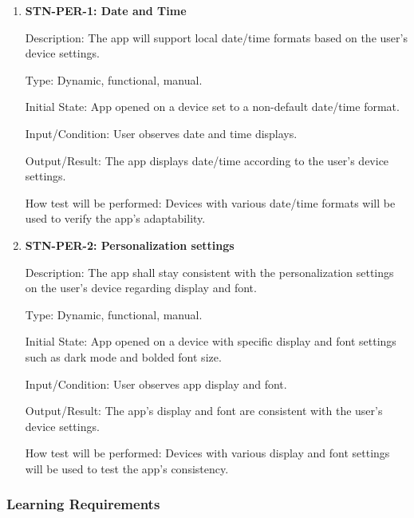 \documentclass[12pt, titlepage]{article}
\begin{document}
    \begin{enumerate}

        \item {\textbf{STN-PER-1: Date and Time}}

        Description: The app will support local date/time formats based on the user’s device settings.

        Type: Dynamic, functional, manual.

        Initial State: App opened on a device set to a non-default date/time format.

        Input/Condition: User observes date and time displays.

        Output/Result: The app displays date/time according to the user's device settings.

        How test will be performed: Devices with various date/time formats will be used to verify the app's adaptability.


        \item{\textbf{STN-PER-2: Personalization settings}}

        Description: The app shall stay consistent with the personalization settings on the user’s device regarding display and font.

        Type: Dynamic, functional, manual.

        Initial State: App opened on a device with specific display and font settings such as dark mode and bolded font size.

        Input/Condition: User observes app display and font.

        Output/Result: The app's display and font are consistent with the user’s device settings.

        How test will be performed: Devices with various display and font settings will be used to test the app's consistency.

    \end{enumerate}

    \subsubsection{Learning Requirements}
\end{document}
